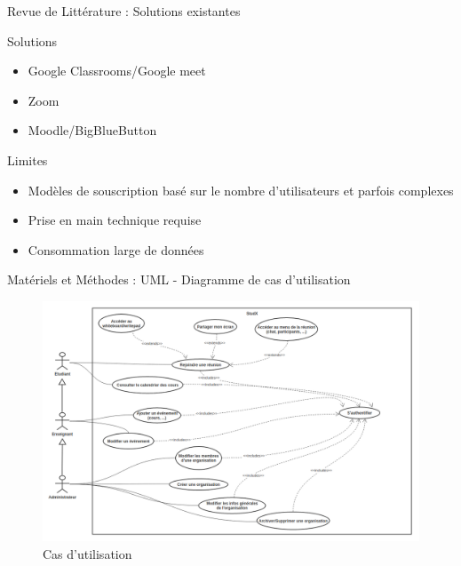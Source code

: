 \documentclass{beamer}
\begin{document}
\begin{frame}{Revue de Littérature : \small{Solutions existantes}}
  \begin{block}{Solutions}
    \begin{itemize}
      \item Google Classrooms/Google meet
      \item Zoom
      \item Moodle/BigBlueButton
    \end{itemize}
  \end{block}
  \begin{block}{Limites}
    \begin{itemize}
      \item Modèles de souscription basé sur le nombre d'utilisateurs et parfois complexes
      \item Prise en main technique requise
      \item Consommation large de données
    \end{itemize}
  \end{block}
\end{frame}
\begin{frame}{Matériels et Méthodes : \small{UML} - \footnotesize{Diagramme de cas d'utilisation}}
  \begin{figure}[H]
    \centering
    \includegraphics[width=\textwidth]{../../images/use-cases-diag.png}
    \caption{Cas d'utilisation}
\end{figure}
\end{frame}
\end{document}
